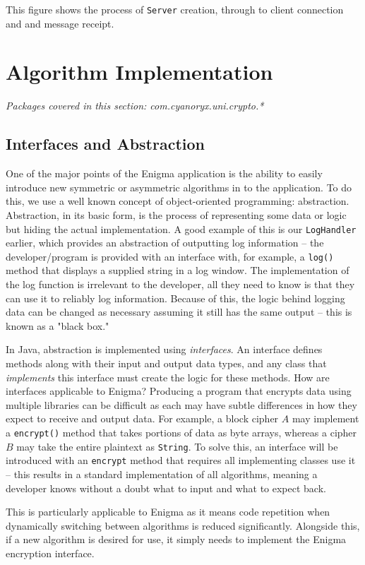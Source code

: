    This figure shows the process of \verb!Server! creation, through to client connection and and message receipt.

\section{Algorithm Implementation}
  \emph{Packages covered in this section: com.cyanoryx.uni.crypto.*}
  
  \subsection{Interfaces and Abstraction}
  
  One of the major points of the Enigma application is the ability to easily introduce new symmetric or asymmetric algorithms in to the application. To do this, we use a well known concept of object-oriented programming: abstraction. Abstraction, in its basic form, is the process of representing some data or logic but hiding the actual implementation. A good example of this is our \verb!LogHandler! earlier, which provides an abstraction of outputting log information -- the developer/program is provided with an interface with, for example, a \verb!log()! method that displays a supplied string in a log window. The implementation of the log function is irrelevant to the developer, all they need to know is that they can use it to reliably log information. Because of this, the logic behind logging data can be changed as necessary assuming it still has the same output -- this is known as a "black box."
  
  In Java, abstraction is implemented using \emph{interfaces}. An interface defines methods along with their input and output data types, and any class that \emph{implements} this interface must create the logic for these methods. How are interfaces applicable to Enigma? Producing a program that encrypts data using multiple libraries can be difficult as each may have subtle differences in how they expect to receive and output data. For example, a block cipher $A$ may implement a \verb!encrypt()! method that takes portions of data as byte arrays, whereas a cipher $B$ may take the entire plaintext as \verb!String!. To solve this, an interface will be introduced with an \verb!encrypt! method that requires all implementing classes use it -- this results in a standard implementation of all algorithms, meaning a developer knows without a doubt what to input and what to expect back.
  
  This is particularly applicable to Enigma as it means code repetition when dynamically switching between algorithms is reduced significantly. Alongside this, if a new algorithm is desired for use, it simply needs to implement the Enigma encryption interface.
  
